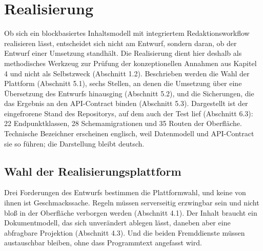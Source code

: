 
\chapter{Realisierung}
\label{kap:realisierung}

Ob sich ein blockbasiertes Inhaltsmodell mit integriertem Redaktionsworkflow realisieren lässt, entscheidet sich nicht am Entwurf, sondern daran, ob der Entwurf einer Umsetzung standhält. Die Realisierung dient hier deshalb als methodisches Werkzeug zur Prüfung der konzeptionellen Annahmen aus Kapitel 4 und nicht als Selbstzweck (Abschnitt 1.2). Beschrieben werden die Wahl der Plattform (Abschnitt 5.1), sechs Stellen, an denen die Umsetzung über eine Übersetzung des Entwurfs hinausging (Abschnitt 5.2), und die Sicherungen, die das Ergebnis an den API-Contract binden (Abschnitt 5.3). Dargestellt ist der eingefrorene Stand des Repositorys, auf dem auch der Test lief (Abschnitt 6.3): 22 Endpunktklassen, 28 Schemamigrationen und 35 Routen der Oberfläche. Technische Bezeichner erscheinen englisch, weil Datenmodell und API-Contract sie so führen; die Darstellung bleibt deutsch.

\section{Wahl der Realisierungsplattform}
\label{sec:plattformwahl}

Drei Forderungen des Entwurfs bestimmen die Plattformwahl, und keine von ihnen ist Geschmackssache. Regeln müssen serverseitig erzwingbar sein und nicht bloß in der Oberfläche verborgen werden (Abschnitt 4.1). Der Inhalt braucht ein Dokumentmodell, das sich unverändert ablegen lässt, daneben aber eine abfragbare Projektion (Abschnitt 4.3). Und die beiden Fremddienste müssen austauschbar bleiben, ohne dass Programmtext angefasst wird.

